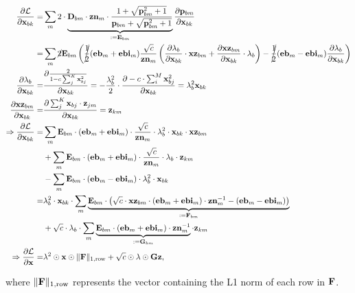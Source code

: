 \documentclass{article}
\begin{document}
\begin{align*}
    \ddfrac{\mathcal{L}}{\v{x}{bk}} = &\sum_m 2 \cdot \underbrace{\v{D}{bm} \cdot \v{zn}{m} \cdot \frac{1 + \sqrt{\v{p}{bm}^2 + 1}}{\v{p}{bm} + \sqrt{\v{p}{bm}^2 + 1}}}_{:= \v{E}{bm}} \ddfrac{\v{p}{bm}}{\v{x}{bk}} \\
    = &\sum_m \cancel{2} \v{E}{bm} \left( \cancel{\frac{1}{2}} (\v{eb}{m} + \v{ebi}{m}) \frac{\sqrt{c}}{\v{zn}{m}} \left( \ddfrac{\lambda_b}{\v{x}{bk}} \cdot \v{x} \v{z}{bm} + \ddfrac{\v{x} \v{z}{bm}}{\v{x}{bk}} \cdot \lambda_b \right) - \cancel{\frac{1}{2}} (\v{eb}{m} - \v{ebi}{m}) \ddfrac{\lambda_b}{\v{x}{bk}} \right) \\
    \ddfrac{\lambda_b}{\v{x}{bk}} = & \ddfrac{\frac{2}{1 - c \sum_j^K \v{x}{bj}^2}}{\v{x}{bk}} = -\frac{\lambda_b^2}{2} \cdot \ddfrac{-c \cdot \sum_i^M \v{x}{bj}^2}{\v{x}{bk}} = \lambda_b^2 \v{x}{bk} \\
    \ddfrac{\v{x} \v{z}{bm}}{\v{x}{bk}} =& \ddfrac{\sum_j^K \v{x}{bj} \cdot \v{z}{jm}}{\v{x}{bk}} = \v{z}{km} \\
    \Rightarrow \ddfrac{\mathcal{L}}{\v{x}{bk}} = &\sum_m \v{E}{bm} \cdot (\v{eb}{m} + \v{ebi}{m}) \cdot \frac{\sqrt{c}}{\v{zn}{m}} \cdot \lambda_b^2 \cdot\v{x}{bk} \cdot \v{x} \v{z}{bm} \\
    &+ \sum_m \v{E}{bm} \cdot (\v{eb}{m} + \v{ebi}{m}) \cdot \frac{\sqrt{c}}{\v{zn}{m}} \cdot \lambda_b \cdot \v{z}{km} \\
    &- \sum_m \v{E}{bm} \cdot (\v{eb}{m} - \v{ebi}{m}) \cdot \lambda_b^2 \cdot \v{x}{bk} \\
    =& \lambda_b^2 \cdot \v{x}{bk} \cdot \sum_m \underbrace{\v{E}{bm} \cdot \left( \sqrt{c} \cdot \v{x} \v{z}{bm} \cdot (\v{eb}{m} + \v{ebi}{m}) \cdot \v{zn}{m}^{-1} - (\v{eb}{m} - \v{ebi}{m}) \right)}_{:= \v{F}{bm}}\\
    &+ \sqrt{c} \cdot \lambda_b \cdot \sum_m \underbrace{\v{E}{bm} \cdot (\v{eb}{m} + \v{ebi}{m}) \cdot \v{zn}{m}^{-1}}_{:= \v{G}{bm}} \cdot \v{z}{km} \\
    \Rightarrow \ddfrac{\mathcal{L}}{\v{x}} =& \lambda^2 \odot \v{x} \odot \rownorm{\v{F}} + \sqrt{c} \odot \lambda \odot \v{G} \v{z},\quad
\end{align*}

where $\rownorm{\v{F}}$ represents the vector containing the L1 norm of each row in $\v{F}$.
\end{document}
